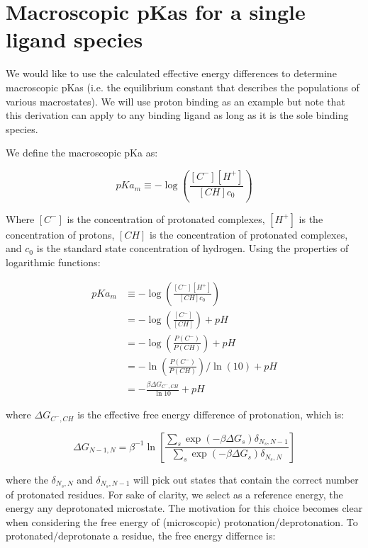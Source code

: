\section{Macroscopic pKas for a single ligand species}

We would like to use the calculated effective energy differences to
determine macroscopic pKas (i.e. the equilibrium constant that
describes the populations of various macrostates). We will use proton
binding as an example but note that this derivation can apply to any
binding ligand as long as it is the sole binding species.

We define the macroscopic pKa as:

\begin{equation}
  pKa_m \equiv -\log \left(\frac{[C^-][H^+]}{[CH] c_0} \right)
\end{equation}

Where $[C^-]$ is the concentration of protonated complexes, $[H^+]$ is
the concentration of protons, $[CH]$ is the concentration of
protonated complexes, and $c_0$ is the standard state concentration of
hydrogen. Using the properties of logarithmic functions:

\begin{align*}
  pKa_m &\equiv -\log \left(\frac{[C^-][H^+]}{[CH] c_0} \right) \\
  &= -\log \left( \frac{[C^-]}{[CH]} \right) + pH \\
  &= -\log \left(\frac{P(C^-)}{P(CH)} \right) + pH \\
  &= -\ln \left( \frac{P(C^-)}{P(CH)} \right)/\ln(10) + pH \\
  &= -\frac{\beta \Delta G_{C^-,CH}}{\ln 10} + pH
\end{align*}

where $\Delta G_{C^-,CH}$ is the effective free energy difference of
protonation, which is: 

\begin{equation}
\Delta G_{N-1,N} = \beta^{-1} \ln \left[ \frac{\sum_s \exp(-\beta
    \Delta G_s)\delta_{N_s,N-1}}{\sum_s \exp(-\beta \Delta
    G_s)\delta_{N_s,N}} \right]
\label{macrostateenergydiff}
\end{equation}

where the $\delta_{N_s,N}$ and $\delta_{N_s,N-1}$ will pick out states
that contain the correct number of protonated residues. For sake of
clarity, we select as a reference energy, the energy any deprotonated
microstate. The motivation for this choice becomes clear when
considering the free energy of (microscopic)
protonation/deprotonation. To protonated/deprotonate a residue, the free energy differnce is:

